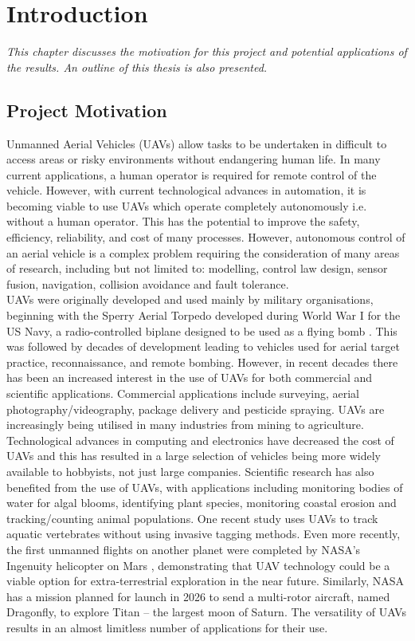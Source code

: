 
\chapter{Introduction}
\textit{This chapter discusses the motivation for this project and potential applications of the results. An outline of this thesis is also presented.}\\

\section{Project Motivation}
Unmanned Aerial Vehicles (UAVs) allow tasks to be undertaken in difficult to access areas or risky environments without endangering human life. In many current applications, a human operator is required for remote control of the vehicle. However, with current technological advances in automation, it is becoming viable to use UAVs which operate completely autonomously i.e. without a human operator. This has the potential to improve the safety, efficiency, reliability, and cost of many processes. However, autonomous control of an aerial vehicle is a complex problem requiring the consideration of many areas of research, including but not limited to: modelling, control law design, sensor fusion, navigation, collision avoidance and fault tolerance.\\

UAVs were originally developed and used mainly by military organisations, beginning with the Sperry Aerial Torpedo developed during World War I for the US Navy, a radio-controlled biplane designed to be used as a flying bomb \cite{Stoff2001}. This was followed by decades of development leading to vehicles used for aerial target practice, reconnaissance, and remote bombing. However, in recent decades there has been an increased interest in the use of UAVs for both commercial and scientific applications. Commercial applications include surveying, aerial photography/videography, package delivery and pesticide spraying. UAVs are increasingly being utilised in many industries from mining to agriculture. Technological advances in computing and electronics have decreased the cost of UAVs and this has resulted in a large selection of vehicles being more widely available to hobbyists, not just large companies. Scientific research has also benefited from the use of UAVs, with applications including monitoring bodies of water for algal blooms, identifying plant species, monitoring coastal erosion and tracking/counting animal populations. One recent study \cite{Raoult2018} uses UAVs to track aquatic vertebrates without using invasive tagging methods. Even more recently, the first unmanned flights on another planet were completed by NASA’s Ingenuity helicopter on Mars \cite{Johnson2021}, demonstrating that UAV technology could be a viable option for extra-terrestrial exploration in the near future. Similarly, NASA has a mission planned for launch in 2026 to send a multi-rotor aircraft, named Dragonfly, to explore Titan – the largest moon of Saturn\cite{Hautaluoma2019}.  The versatility of UAVs results in an almost limitless number of applications for their use.\\


